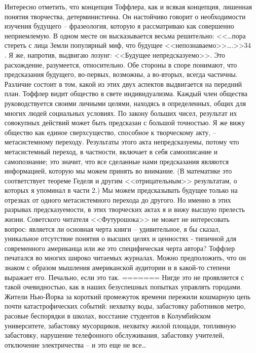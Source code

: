 \documentclass{book}
\begin{document}
{Интересно отметить, что концепция Тоффлера, как и всякая концепция, лишенная понятия творчества, детерминистична. Он настойчиво говорит о необходимости изучения  будущего -- фразеология, которую я рассматриваю как совершенно непри­емлемую. В одном месте он высказывается весьма решитель­но: <<\ldots пора стереть с лица Земли популярный миф, что буду­щее <<непознаваемо>>\ldots.>>34 . Я же, напротив, выдвигаю лозунг: <<Будущее непредсказуемо>>. Это расхождение, разумеется, от­носительно. Обе стороны в споре понимают, что предсказания будущего, во‑первых, возможны, а во‑вторых, всегда частичны. Различие состоит в том, какой из этих двух аспектов выд­вигается на передний план. Тоффлер видит общество в свете индивидуализма. Каждый член общества руководствуется своими личными целями, находясь в определенных, общих для многих людей социальных условиях. По закону больших чисел, результат их совокупных действий может быть предсказан с большой точностью. Я же вижу общество как единое сверх­существо, способное к творческому акту, -- метасистемному пе­реходу. Результаты этого акта непредсказуемы, потому что метасистемный переход, в частности, включает в себя самоописа­ние  и самопознание;  это значит, что все сделанные нами пред­сказания являются информацией, которую мы можем принять во внимание. (В математике это соответствует теореме Геделя и другим <<отрицательным>> результатам, о которых я упоминал в части 2.) Мы можем предсказывать будущее только на отрез­ках от одного метасистемного перехода до другого. Но именно в этих разрывах предсказуемости, в этих творческих актах я и вижу высшую прелесть жизни.
Советского читателя <<Футурошока>> не может не интересо­вать вопрос: является ли основная черта книги -- удивительное, я бы сказал, уникальное  отсутствие понятия о высших целях и ценностях ‑ типичной для современного американца или же это специфическая черта автора? Тоффлер печатался во многих широко читаемых журналах. Можно предположить, что он зна­ком с образом мышления американской аудитории и в какой‑то степени выражает его. Печально, если это так.
=======
Нигде это не проявляется с такой очевидностью, как в наших безуспешных попытках управлять городами. Жители Нью-Йорка за короткий промежуток времени пережили кошмарную цепь почти катастрофических событий: нехватку воды, забастовку работников метро, расовые беспорядки в школах, восстание студентов в Колумбийском университете, забастовку мусорщиков, нехватку жилой площади, топливную забастовку, нарушение телефонного обслуживания, забастовку учителей, отключение электричества -- и это еще не все\ldots
}
\end{document}
